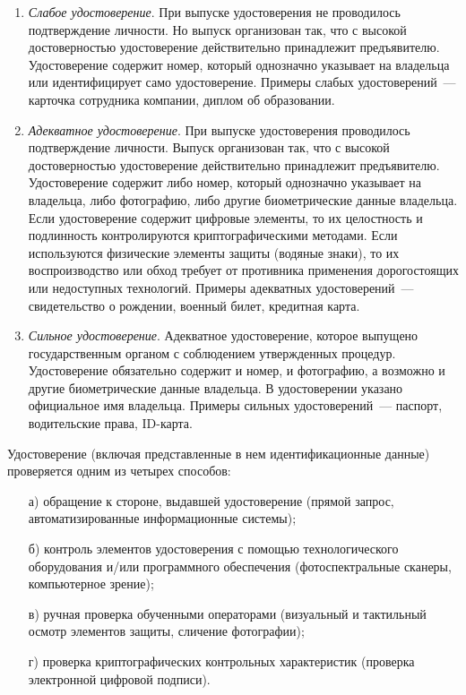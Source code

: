 \begin{enumerate}
\item
{\it Слабое удостоверение}. 
При выпуске удостоверения не проводилось подтверждение личности.
Но выпуск организован так, что с высокой достоверностью
удостоверение действительно принадлежит предъявителю. 
Удостоверение содержит номер, который однозначно указывает на владельца
или идентифицирует само удостоверение.
%
Примеры слабых удостоверений~--- карточка сотрудника компании,
диплом об образовании.


\item
{\it Адекватное удостоверение}. 
При выпуске удостоверения проводилось подтверждение личности.
Выпуск организован так, что с высокой достоверностью
удостоверение действительно принадлежит предъявителю. 
%
Удостоверение содержит либо номер, который однозначно указывает на 
владельца, либо фотографию, либо другие биометрические данные владельца.
% 
Если удостоверение содержит цифровые элементы, то их целостность и 
подлинность контролируются криптографическими методами. 
%
Если используются физические элементы защиты (водяные знаки),  
то их воспроизводство или обход требует от противника применения 
дорогостоящих или недоступных технологий. 
%
Примеры адекватных удостоверений~--- свидетельство о рождении,
военный билет, кредитная карта.

\item
{\it Сильное удостоверение}. 
Адекватное удостоверение, которое выпущено государственным органом с 
соблюдением утвержденных процедур. Удостоверение обязательно содержит и 
номер, и фотографию, а возможно и другие биометрические данные владельца.
В удостоверении указано официальное имя владельца.
%
Примеры сильных удостоверений~--- паспорт, водительские права, ID-карта.
\end{enumerate}

Удостоверение (включая представленные в нем идентификационные данные) 
проверяется одним из четырех способов:
\begin{enumerate}
\item[а)]
обращение к стороне, выдавшей удостоверение (прямой запрос, 
автоматизированные информационные системы);
%
%
\item[б)]
контроль элементов удостоверения с помощью технологического оборудования 
и/или программного обеспечения (фотоспектральные сканеры, компьютерное 
зрение);
%
%
\item[в)]
ручная проверка обученными операторами (визуальный и тактильный осмотр 
элементов защиты, сличение фотографии);
%

\item[г)]
проверка криптографических контрольных характеристик
(проверка электронной цифровой подписи).
%
%
\end{enumerate}

